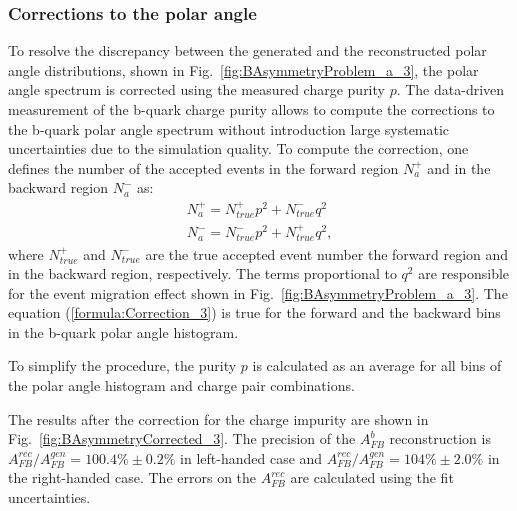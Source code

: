 \subsubsection{Corrections to the polar angle}
To resolve the discrepancy between the generated and the reconstructed polar angle distributions, shown in Fig.~\ref{fig:BAsymmetryProblem_a_3}, the polar angle spectrum is corrected using the measured charge purity $p$.
The data-driven measurement of the b-quark charge purity allows to compute the corrections to the b-quark polar angle spectrum without introduction large systematic uncertainties due to the simulation quality. 
To compute the correction, one defines the number of the accepted events in the forward region $N_a^+$ and in the backward region $N_a^-$ as:
\begin{equation}
\begin{array}{l}
N_a^+ =  N^+_{true}p^2 + N^-_{true}q^2\\
N_a^- =  N^-_{true}p^2 + N^+_{true}q^2,
\end{array}
\label{formula:Correction_3}
\end{equation}
where $N_{true}^+$ and  $N_{true}^-$ are the true accepted event number the forward region and in the backward region, respectively.
The terms proportional to $q^2$ are responsible for the event migration effect shown in Fig.~\ref{fig:BAsymmetryProblem_a_3}.
The equation (\ref{formula:Correction_3}) is true for the forward and the backward bins in the b-quark polar angle histogram.

To simplify the procedure, the purity $p$ is calculated as an average for all bins of the polar angle histogram and charge pair combinations. 


The results after the correction for the charge impurity are shown in Fig.~\ref{fig:BAsymmetryCorrected_3}. 
The precision of the $A_{FB}^b$ reconstruction is $A_{FB}^{rec}/A^{gen}_{FB} = 100.4\%\pm 0.2\%$ in left-handed case and  $A_{FB}^{rec}/A^{gen}_{FB} = 104\%\pm2.0\%$ in the right-handed case. 
The errors on the $A_{FB}^{rec}$ are calculated using the fit uncertainties. 


